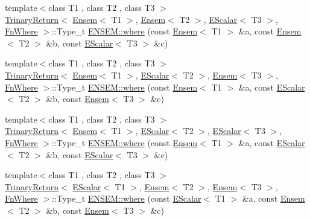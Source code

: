 \begin{DoxyCompactItemize}
\item 
{\footnotesize template$<$class T1 , class T2 , class T3 $>$ }\\\mbox{\hyperlink{structENSEM_1_1TrinaryReturn}{Trinary\+Return}}$<$ \mbox{\hyperlink{classENSEM_1_1Ensem}{Ensem}}$<$ T1 $>$, \mbox{\hyperlink{classENSEM_1_1Ensem}{Ensem}}$<$ T2 $>$, \mbox{\hyperlink{classENSEM_1_1EScalar}{E\+Scalar}}$<$ T3 $>$, \mbox{\hyperlink{structENSEM_1_1FnWhere}{Fn\+Where}} $>$\+::Type\+\_\+t \mbox{\hyperlink{group__eensem_ga954917c149f91e175980e8359b2e02a2}{E\+N\+S\+E\+M\+::where}} (const \mbox{\hyperlink{classENSEM_1_1Ensem}{Ensem}}$<$ T1 $>$ \&a, const \mbox{\hyperlink{classENSEM_1_1Ensem}{Ensem}}$<$ T2 $>$ \&b, const \mbox{\hyperlink{classENSEM_1_1EScalar}{E\+Scalar}}$<$ T3 $>$ \&c)
\item 
{\footnotesize template$<$class T1 , class T2 , class T3 $>$ }\\\mbox{\hyperlink{structENSEM_1_1TrinaryReturn}{Trinary\+Return}}$<$ \mbox{\hyperlink{classENSEM_1_1Ensem}{Ensem}}$<$ T1 $>$, \mbox{\hyperlink{classENSEM_1_1EScalar}{E\+Scalar}}$<$ T2 $>$, \mbox{\hyperlink{classENSEM_1_1Ensem}{Ensem}}$<$ T3 $>$, \mbox{\hyperlink{structENSEM_1_1FnWhere}{Fn\+Where}} $>$\+::Type\+\_\+t \mbox{\hyperlink{group__eensem_ga8e810f6bd36674024a877b4ff879c3fe}{E\+N\+S\+E\+M\+::where}} (const \mbox{\hyperlink{classENSEM_1_1Ensem}{Ensem}}$<$ T1 $>$ \&a, const \mbox{\hyperlink{classENSEM_1_1EScalar}{E\+Scalar}}$<$ T2 $>$ \&b, const \mbox{\hyperlink{classENSEM_1_1Ensem}{Ensem}}$<$ T3 $>$ \&c)
\item 
{\footnotesize template$<$class T1 , class T2 , class T3 $>$ }\\\mbox{\hyperlink{structENSEM_1_1TrinaryReturn}{Trinary\+Return}}$<$ \mbox{\hyperlink{classENSEM_1_1Ensem}{Ensem}}$<$ T1 $>$, \mbox{\hyperlink{classENSEM_1_1EScalar}{E\+Scalar}}$<$ T2 $>$, \mbox{\hyperlink{classENSEM_1_1EScalar}{E\+Scalar}}$<$ T3 $>$, \mbox{\hyperlink{structENSEM_1_1FnWhere}{Fn\+Where}} $>$\+::Type\+\_\+t \mbox{\hyperlink{group__eensem_ga16076c28e8993bb0aad6e627a1f0b018}{E\+N\+S\+E\+M\+::where}} (const \mbox{\hyperlink{classENSEM_1_1Ensem}{Ensem}}$<$ T1 $>$ \&a, const \mbox{\hyperlink{classENSEM_1_1EScalar}{E\+Scalar}}$<$ T2 $>$ \&b, const \mbox{\hyperlink{classENSEM_1_1EScalar}{E\+Scalar}}$<$ T3 $>$ \&c)
\item 
{\footnotesize template$<$class T1 , class T2 , class T3 $>$ }\\\mbox{\hyperlink{structENSEM_1_1TrinaryReturn}{Trinary\+Return}}$<$ \mbox{\hyperlink{classENSEM_1_1EScalar}{E\+Scalar}}$<$ T1 $>$, \mbox{\hyperlink{classENSEM_1_1Ensem}{Ensem}}$<$ T2 $>$, \mbox{\hyperlink{classENSEM_1_1Ensem}{Ensem}}$<$ T3 $>$, \mbox{\hyperlink{structENSEM_1_1FnWhere}{Fn\+Where}} $>$\+::Type\+\_\+t \mbox{\hyperlink{group__eensem_ga25b89d44a0521a8e9be1de7b1e8010b8}{E\+N\+S\+E\+M\+::where}} (const \mbox{\hyperlink{classENSEM_1_1EScalar}{E\+Scalar}}$<$ T1 $>$ \&a, const \mbox{\hyperlink{classENSEM_1_1Ensem}{Ensem}}$<$ T2 $>$ \&b, const \mbox{\hyperlink{classENSEM_1_1Ensem}{Ensem}}$<$ T3 $>$ \&c)

\end{DoxyCompactItemize}

